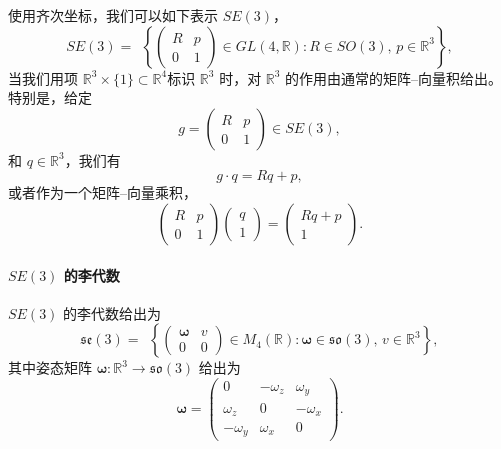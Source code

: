 \documentclass[11pt,fontset=founder]{ctexart}
\begin{document}
使用齐次坐标，我们可以如下表示 $SE(3)$，
\begin{equation*}
SE(3)=\ \ \left\{ \left(
\begin{array}{cc}
R & p \\
0 & 1%
\end{array}%
\right) \in GL(4,\mathbb{R}):R\in SO(3),\,p\in \mathbb{R}^{3}\right\} ,
\end{equation*}%
当我们用项 $\mathbb{R}^{3}\times \{1\}\subset \mathbb{R}^{4}$标识 $\mathbb{R}^{3}$ 时，对 $\mathbb{R}^{3}$ 的作用由通常的矩阵–向量积给出。特别是，给定%
\begin{equation*}
g=\left(
\begin{array}{cc}
R & p \\
0 & 1%
\end{array}%
\right) \in SE(3),
\end{equation*}%
和 $q\in \mathbb{R}^{3}$，我们有%
\begin{equation*}
g\cdot q=Rq+p,
\end{equation*}%
或者作为一个矩阵–向量乘积，%
\begin{equation*}
\left(
\begin{array}{cc}
R & p \\
0 & 1%
\end{array}%
\right) \left(
\begin{array}{c}
q \\
1%
\end{array}%
\right) =\left(
\begin{array}{c}
Rq+p \\
1%
\end{array}%
\right) .
\end{equation*}

\paragraph{$SE(3)$ 的李代数}

$SE(3)$ 的李代数给出为 \
\begin{equation*}
\mathfrak{se}(3)=\ \ \left\{ \left(
\begin{array}{cc}
\mathbf{\omega} & v \\
0 & 0%
\end{array}%
\right) \in M_{4}(\mathbb{R}):\mathbf{\omega}\in \mathfrak{so}(3),\,v\in
\mathbb{R}^{3}\right\} ,
\end{equation*}%
其中姿态矩阵 $\mathbf{\omega}:\mathbb{R}^{3}\rightarrow
\mathfrak{so}(3)$ 给出为%
\begin{equation*}
\mathbf{\omega}=\left(
\begin{array}{ccc}
0 & -\omega _{z} & \omega _{y} \\
\omega _{z} & 0 & -\omega _{x} \\
-\omega _{y} & \omega _{x} & 0%
\end{array}%
\right) .
\end{equation*}
\end{document}
